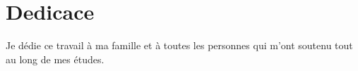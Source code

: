 \chapter*{Dedicace}
{}

Je dédie ce travail à ma famille et à toutes les personnes qui m'ont soutenu tout au long de mes études.

\clearpage
